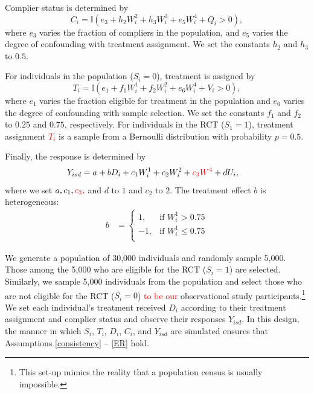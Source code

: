 \documentclass[hidelinks,12pt]{article}
\newcommand{\ind}{\mathbb{I}} %
\begin{document}
Complier status is determined by
%	
\begin{equation*}
C_i = \ind(e_3 + h_2W^{2}_i + h_3W^{3}_i + e_5W^{4}_i + Q_i > 0),
\end{equation*}	
%
where $e_3$ varies the fraction of compliers in the population, and $e_5$ varies the degree of confounding with treatment assignment. We set the constants $h_2$ and $h_3$ to $0.5$. 

For individuals in the population ($S_i=0$), treatment is assigned by
%	
\begin{equation*}
T_i = \ind(e_1 + f_1W^{1}_i + f_2W^{2}_i + e_6W^{4}_i + V_i > 0),
\end{equation*}	
%
where $e_1$ varies the fraction eligible for treatment in the population and $e_6$ varies the degree of confounding with sample selection. We set the constants $f_1$ and $f_2$ to $0.25$ and $0.75$, respectively. For individuals in the RCT ($S_1=1$), treatment assignment \textcolor{red}{$T_i$} is a sample from a Bernoulli distribution with probability $p=0.5$.

Finally, the response is determined by 
%	
\begin{align*}
Y_{isd} &= a + bD_i + c_1W^{1}_i + c_2W^{2}_i + \textcolor{red}{c_3W^{4}} +dU_i,
\end{align*}
%
where we set $a, c_1, \textcolor{red}{c_3,}$ and $d$ to $1$ and $c_2$ to $2$. The treatment effect $b$ is heterogeneous:
\begin{align*}
b &= \left\{
			\begin{array}{rr}
        1, & \text{if } W^{1}_i > 0.75\\
		-1, & \text{if } W^{1}_i \leq 0.75\\
			\end{array}\right.
\end{align*}	 
 
We generate a population of 30,000 individuals and randomly sample 5,000. Those among the 5,000 who are eligible for the RCT ($S_i=1$) are selected. Similarly, we sample 5,000 individuals from the population and select those who are not eligible for the RCT ($S_i=0$) \textcolor{red}{to be our} observational study participants.\footnote{This set-up mimics the reality that a population census is usually impossible.} We set each individual's treatment received $D_i$ according to their treatment assignment and complier status and observe their responses $Y_{isd}$. In this design, the manner in which $S_i$, $T_i$, $D_i$, $C_i$, and $Y_{isd}$ are simulated ensures that Assumptions \eqref{consistency} -- \eqref{ER} hold.
\end{document}
